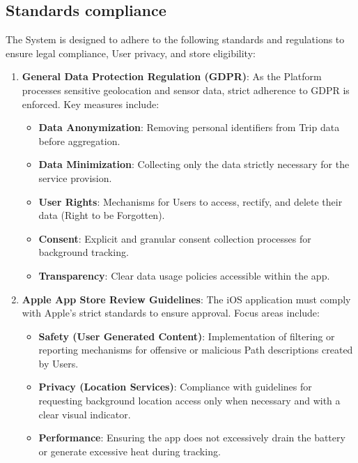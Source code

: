 \subsection{Standards compliance}
\label{standards-compliance}
The System is designed to adhere to the following standards and regulations to ensure legal compliance, User privacy, and store eligibility:

\begin{enumerate}
    \item \textbf{General Data Protection Regulation (GDPR)}:
    As the Platform processes sensitive geolocation and sensor data, strict adherence to GDPR is enforced. Key measures include:
    \begin{itemize}
        \item \textbf{Data Anonymization}: Removing personal identifiers from Trip data before aggregation.
        \item \textbf{Data Minimization}: Collecting only the data strictly necessary for the service provision.
        \item \textbf{User Rights}: Mechanisms for Users to access, rectify, and delete their data (Right to be Forgotten).
        \item \textbf{Consent}: Explicit and granular consent collection processes for background tracking.
        \item \textbf{Transparency}: Clear data usage policies accessible within the app.
    \end{itemize}

    \item \textbf{Apple App Store Review Guidelines}:
    The iOS application must comply with Apple's strict standards to ensure approval. Focus areas include:
    \begin{itemize}
        \item \textbf{Safety (User Generated Content)}: Implementation of filtering or reporting mechanisms for offensive or malicious Path descriptions created by Users.
        \item \textbf{Privacy (Location Services)}: Compliance with guidelines for requesting background location access only when necessary and with a clear visual indicator.
        \item \textbf{Performance}: Ensuring the app does not excessively drain the battery or generate excessive heat during tracking.
    \end{itemize}


\end{enumerate}
